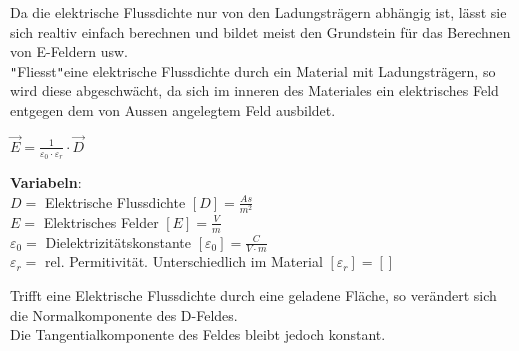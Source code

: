 Da die elektrische Flussdichte nur von den Ladungsträgern abhängig ist, lässt sie sich realtiv einfach berechnen und bildet meist den Grundstein für
das Berechnen von E-Feldern usw. \\
\texttt{"}Fliesst\texttt{"}eine elektrische Flussdichte durch ein Material mit Ladungsträgern, so wird diese abgeschwächt, da sich im inneren des Materiales ein
elektrisches Feld entgegen dem von Aussen angelegtem Feld ausbildet. \\
\begin{center}
\end{center}

\begingl
\begin{center}
	\formulaBegin
	$ \vec{E} = \frac{1}{\varepsilon_0 \cdot \varepsilon_r} \cdot \vec{D}$
	\formulaEnd
\end{center}
\textbf{Variabeln}: \\
$D = $ Elektrische Flussdichte $ [D] = \frac{As}{m^2}$ \\
$ E = $ Elektrisches Felder $[E] = \frac{V}{m}$ \\
$ \varepsilon_0 = $ Dielektrizitätskonstante $ [\varepsilon_0] = \frac{C}{V\cdot m}$ \\
$ \varepsilon_r = $ rel. Permitivität. Unterschiedlich im Material $ [\varepsilon_r] = [ ]$ \\

\iend



\beginip
Trifft eine Elektrische Flussdichte durch eine geladene Fläche, so verändert sich die Normalkomponente des D-Feldes. \\
Die Tangentialkomponente des Feldes bleibt jedoch konstant. \\

